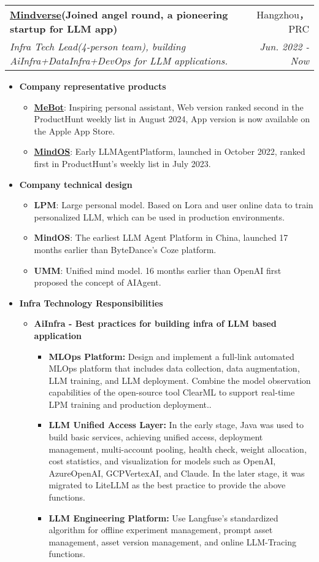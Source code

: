 \documentclass[letterpaper,11pt]{article}
\makeatletter
\newcommand{\resumeSubheading}[4]{
	\vspace{-1pt}\item
	\begin{tabular*}{0.97\textwidth}[t]{l@{\extracolsep{\fill}}r}
		\textbf{#1} & #2 \\
		\textit{\small#3} & \textit{\small #4} \\
	\end{tabular*}\vspace{-5pt}
}
\makeatother
\begin{document}
\begin{spacing}{0.9}
	
	\resumeSubheading
	{\href{https://home.mindos.com}{Mindverse}(Joined angel round, a pioneering startup for LLM app)}{Hangzhou，PRC}
	{Infra Tech Lead(4-person team), building AiInfra+DataInfra+DevOps for LLM applications.}{Jun. 2022 - Now}
	\begin{itemize}
		\item \textbf{Company representative products}
		\begin{itemize}
			\item \href{https://me.bot}{\textbf{MeBot}}: Inspiring personal assistant, Web version ranked second in the ProductHunt weekly list in August 2024, App version is now available on the Apple App Store.
			\item \href{https://mindos.com}{\textbf{MindOS}}: Early LLMAgentPlatform, launched in October 2022, ranked first in ProductHunt's weekly list in July 2023.
		\end{itemize}
		\item \textbf{Company technical design}
		\begin{itemize}
			\item {\textbf{LPM}}: Large personal model. Based on Lora and user online data to train personalized LLM, which can be used in production environments.
			\item {\textbf{MindOS}}: The earliest LLM Agent Platform in China, launched 17 months earlier than ByteDance's Coze platform.
			\item {\textbf{UMM}}: Unified mind model. 16 months earlier than OpenAI first proposed the concept of AIAgent.
		\end{itemize}
		\item \textbf{Infra Technology Responsibilities}
		\begin{itemize}
			\item \textbf{AiInfra - Best practices for building infra of LLM based application}
			\begin{itemize}
				\item \textbf{MLOps Platform: }Design and implement a full-link automated MLOps platform that includes data collection, data augmentation, LLM training, and LLM deployment. Combine the model observation capabilities of the open-source tool ClearML to support real-time LPM training and production deployment..
				\item \textbf{LLM Unified Access Layer: }In the early stage, Java was used to build basic services, achieving unified access, deployment management, multi-account pooling, health check, weight allocation, cost statistics, and visualization for models such as OpenAI, AzureOpenAI, GCPVertexAI, and Claude. In the later stage, it was migrated to LiteLLM as the best practice to provide the above functions.
				\item \textbf{LLM Engineering Platform: }Use Langfuse's standardized algorithm for offline experiment management, prompt asset management, asset version management, and online LLM-Tracing functions.
			\end{itemize}
			

\end{itemize}
\end{itemize}
\end{spacing}
\end{document}
